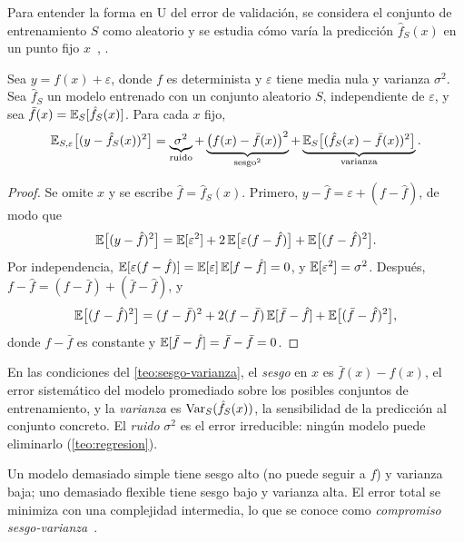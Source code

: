 Para entender la forma en U del error de validación, se considera el conjunto de entrenamiento $S$ como aleatorio y se estudia cómo varía la predicción $\hat f_S(x)$ en un punto fijo $x$~\cite[§8.1.1]{cs229}, \cite[§7.3]{esl}.

\begin{teorema}\label{teo:sesgo-varianza}
Sea $y=f(x)+\varepsilon$, donde $f$ es determinista y $\varepsilon$ tiene media nula y varianza $\sigma^{2}$. Sea $\hat f_S$ un modelo entrenado con un conjunto aleatorio $S$, independiente de $\varepsilon$, y sea $\bar f(x)=\mathbb{E}_S[\hat f_S(x)]$. Para cada $x$ fijo,
\[
\mathbb{E}_{S,\varepsilon}\bigl[(y-\hat f_S(x))^{2}\bigr]
=\underbrace{\sigma^{2}}_{\text{ruido}}
+\underbrace{\bigl(f(x)-\bar f(x)\bigr)^{2}}_{\text{sesgo}^{2}}
+\underbrace{\mathbb{E}_S\bigl[(\hat f_S(x)-\bar f(x))^{2}\bigr]}_{\text{varianza}}.
\]
\end{teorema}

\begin{proof}
Se omite $x$ y se escribe $\hat f=\hat f_S(x)$. Primero, $y-\hat f=\varepsilon+(f-\hat f)$, de modo que
\[
\mathbb{E}\bigl[(y-\hat f)^{2}\bigr]=\mathbb{E}[\varepsilon^{2}]+2\,\mathbb{E}\bigl[\varepsilon(f-\hat f)\bigr]+\mathbb{E}\bigl[(f-\hat f)^{2}\bigr].
\]
Por independencia, $\mathbb{E}[\varepsilon(f-\hat f)]=\mathbb{E}[\varepsilon]\,\mathbb{E}[f-\hat f]=0$, y $\mathbb{E}[\varepsilon^{2}]=\sigma^{2}$. Después, $f-\hat f=(f-\bar f)+(\bar f-\hat f)$, y
\[
\mathbb{E}\bigl[(f-\hat f)^{2}\bigr]=(f-\bar f)^{2}+2(f-\bar f)\,\mathbb{E}[\bar f-\hat f]+\mathbb{E}\bigl[(\bar f-\hat f)^{2}\bigr],
\]
donde $f-\bar f$ es constante y $\mathbb{E}[\bar f-\hat f]=\bar f-\bar f=0$.
\end{proof}

\begin{definicion}
En las condiciones del \cref{teo:sesgo-varianza}, el \emph{sesgo} en $x$ es $\bar f(x)-f(x)$, el error sistemático del modelo promediado sobre los posibles conjuntos de entrenamiento, y la \emph{varianza} es $\operatorname{Var}_S(\hat f_S(x))$, la sensibilidad de la predicción al conjunto concreto. El \emph{ruido} $\sigma^{2}$ es el error irreducible: ningún modelo puede eliminarlo (\cref{teo:regresion}).
\end{definicion}

Un modelo demasiado simple tiene sesgo alto (no puede seguir a $f$) y varianza baja; uno demasiado flexible tiene sesgo bajo y varianza alta. El error total se minimiza con una complejidad intermedia, lo que se conoce como \emph{compromiso sesgo-varianza}~\cite[§2.9]{esl}.

